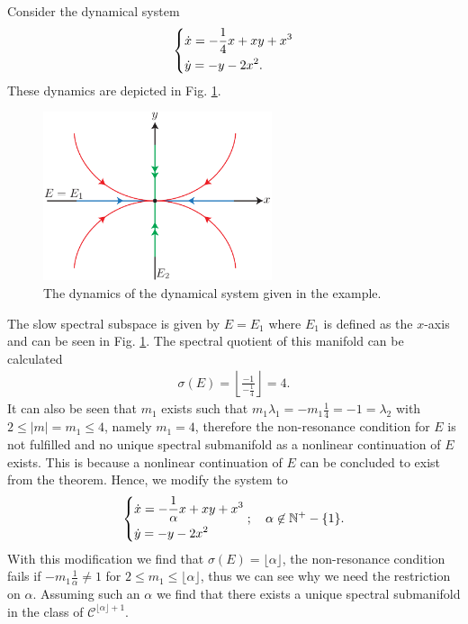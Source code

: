 \begin{ex}[]
	Consider the dynamical system
	\begin{align}
		\begin{dcases}
			\dot{x} = - \frac{1}{4}x + xy + x^{3}\\
			\dot{y} = -y - 2x^2.
		\end{dcases}
	\end{align}
	These dynamics are depicted in Fig. \ref{fig:SSM_ex1}.
	\begin{figure}[h!]
		\centering
		\includegraphics[width=0.6\textwidth]{figures/ch9/31ssm_ex1.pdf}
		\caption{The dynamics of the dynamical system given in the example.}
		\label{fig:SSM_ex1}
	\end{figure}	
	The slow spectral subspace is given by $E=E_1$ where $E_1$ is defined as the $x$-axis and can be seen in Fig. \ref{fig:SSM_ex1}. The spectral quotient of this manifold can be calculated
	\begin{align}
		\sigma(E) = \left\lfloor \frac{-1}{-\frac{1}{4}} \right\rfloor = 4.
	\end{align}
	It can also be seen that $m_1$ exists such that $m_1\lambda_1 = -m_1 \frac{1}{4} = -1 = \lambda_2 $ with $2 \leq |m| =m_1 \leq 4$, namely $m_1=4$, therefore the non-resonance condition for $E$ is not fulfilled and no unique spectral submanifold as a nonlinear continuation of $E$ exists. This is because a nonlinear continuation of $E$ can be concluded to exist from the theorem.
	Hence, we modify the system to
	\begin{align}
		\begin{dcases}
			\dot{x} = -\frac{1}{\alpha } x + xy + x^{3}\\
			\dot{y} = -y - 2x^2
		\end{dcases};\quad
		\alpha \not \in \mathbb{N}^{+} -\{1\}.
	\end{align}
	With this modification we find that $\sigma(E) = \lfloor \alpha \rfloor$, the non-resonance condition fails if $-m_1 \frac{1}{\alpha } \neq 1$ for $2\leq m_1 \leq \lfloor \alpha \rfloor$, thus we can see why we need the restriction on $\alpha $. Assuming such an $\alpha $ we find that there exists a unique spectral submanifold in the class of $\mathcal{C}^{\lfloor \alpha \rfloor + 1}$.


\end{ex}
